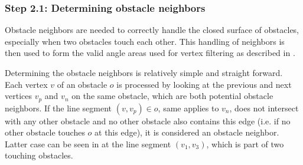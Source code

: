		\subsubsection{Step 2.1: Determining obstacle neighbors}
			
			Obstacle neighbors are needed to correctly handle the closed surface of obstacles, especially when two obstacles touch each other.
			This handling of neighbors is then used to form the valid angle areas used for vertex filtering as described in .
			
			Determining the obstacle neighbors is relatively simple and straight forward.
			Each vertex $v$ of an obstacle $o$ is processed by looking at the previous and next vertices $v_p$ and $v_n$ on the same obstacle, which are both potential obstacle neighbors.
			If the line segment $(v, v_p) \in o$, same applies to $v_n$, does not intersect with any other obstacle and no other obstacle also contains this edge (i.e. if no other obstacle touches $o$ at this edge), it is considered an obstacle neighbor.
			Latter case can be seen in  at the line segment $(v_1, v_3)$, which is part of two touching obstacles.
						
